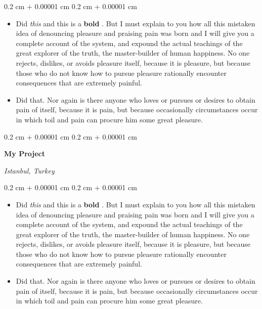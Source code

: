 \documentclass[10pt, letterpaper]{article}
\newenvironment{highlights}{
    \begin{itemize}[
        topsep=0.10 cm,
        parsep=0.10 cm,
        partopsep=0pt,
        itemsep=0pt,
        leftmargin=0.4 cm + 10pt
    ]
}{
    \end{itemize}
} %
\newenvironment{onecolentry}{
    \begin{adjustwidth}{
        0.2 cm + 0.00001 cm
    }{
        0.2 cm + 0.00001 cm
    }
}{
    \end{adjustwidth}
} %
\newenvironment{twocolentry}[2][]{
    \onecolentry
    \def\secondColumn{#2}
    \setcolumnwidth{\fill, 4.5 cm}
    \begin{paracol}{2}
}{
    \switchcolumn \raggedleft \secondColumn
    \end{paracol}
    \endonecolentry
} %
\let\hrefWithoutArrow\href
\renewcommand{\href}[2]{\hrefWithoutArrow{#1}{\ifthenelse{\equal{#2}{}}{ }{#2 }\raisebox{.15ex}{\footnotesize \faExternalLink*}}}
\begin{document}
        \vspace{0.10 cm}
        \begin{onecolentry}
            \begin{highlights}
                \item Did \textit{this} and this is a \textbf{bold} \href{https://example.com}{link}. But I must explain to you how all this mistaken idea of denouncing pleasure and praising pain was born and I will give you a complete account of the system, and expound the actual teachings of the great explorer of the truth, the master-builder of human happiness. No one rejects, dislikes, or avoids pleasure itself, because it is pleasure, but because those who do not know how to pursue pleasure rationally encounter consequences that are extremely painful.
                \item Did that. Nor again is there anyone who loves or pursues or desires to obtain pain of itself, because it is pain, but because occasionally circumstances occur in which toil and pain can procure him some great pleasure.
            \end{highlights}
        \end{onecolentry}


        \vspace{0.2 cm}

        \begin{twocolentry}{
        \textit{Istanbul, Turkey}    
            
        }
            \textbf{My Project}
        \end{twocolentry}

        \vspace{0.10 cm}
        \begin{onecolentry}
            \begin{highlights}
                \item Did \textit{this} and this is a \textbf{bold} \href{https://example.com}{link}. But I must explain to you how all this mistaken idea of denouncing pleasure and praising pain was born and I will give you a complete account of the system, and expound the actual teachings of the great explorer of the truth, the master-builder of human happiness. No one rejects, dislikes, or avoids pleasure itself, because it is pleasure, but because those who do not know how to pursue pleasure rationally encounter consequences that are extremely painful.
                \item Did that. Nor again is there anyone who loves or pursues or desires to obtain pain of itself, because it is pain, but because occasionally circumstances occur in which toil and pain can procure him some great pleasure.
            \end{highlights}
        \end{onecolentry}
\end{document}
